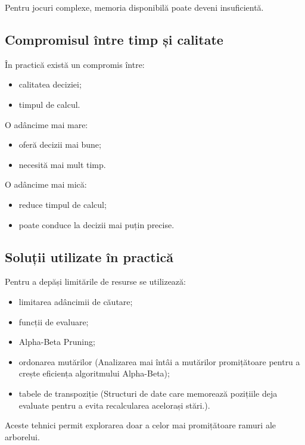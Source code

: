 \documentclass[12pt,a4paper]{article}
\begin{document}
Pentru jocuri complexe, memoria disponibilă poate deveni insuficientă.

\subsection{Compromisul între timp și calitate}

În practică există un compromis între:

\begin{itemize}
\item calitatea deciziei;
\item timpul de calcul.
\end{itemize}

O adâncime mai mare:

\begin{itemize}
\item oferă decizii mai bune;
\item necesită mai mult timp.
\end{itemize}

O adâncime mai mică:

\begin{itemize}
\item reduce timpul de calcul;
\item poate conduce la decizii mai puțin precise.
\end{itemize}

\subsection{Soluții utilizate în practică}

Pentru a depăși limitările de resurse se utilizează:

\begin{itemize}
\item limitarea adâncimii de căutare;
\item funcții de evaluare;
\item Alpha-Beta Pruning;
\item ordonarea mutărilor (Analizarea mai întâi a mutărilor promițătoare pentru a crește eficiența algoritmului Alpha-Beta);
\item tabele de transpoziție (Structuri de date care memorează pozițiile deja evaluate pentru a evita recalcularea acelorași stări.).
\end{itemize}

Aceste tehnici permit explorarea doar a celor mai promițătoare ramuri ale arborelui.
\end{document}
